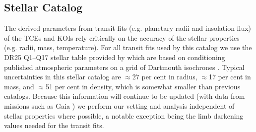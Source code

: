 \subsection{Stellar Catalog}
The derived parameters from transit fits (e.g. planetary radii and insolation flux) of the TCEs and KOIs rely critically on the accuracy of the stellar properties (e.g. radii, mass, temperature).   For all transit fits used by this catalog we use the DR25 Q1--Q17 stellar table provided by \citet{Mathur2017} which are based on conditioning published atmospheric parameters on a grid of Dartmouth isochrones \citet{Dotter2008}.  Typical uncertainties in this stellar catalog are $\approx$27 per cent in radius, $\approx$17 per cent in mass, and $\approx$51 per cent in density, which is somewhat smaller than previous catalogs. Because this information will continue to be updated (with data from missions such as Gaia \citet{Gaia2016}) we perform our vetting and analysis independent of stellar properties where possible, a notable exception being the limb darkening values needed for the transit fits.